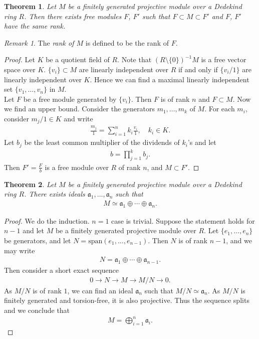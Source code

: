\documentclass[12pt]{article}
\theoremstyle{plain}
\newtheorem{theorem}{Theorem}[section]
\theoremstyle{remark}
\newtheorem*{remark}{Remark}
\theoremstyle{definition}
\begin{document}
\begin{theorem}
    Let $M$ be a finitely generated projective module over a Dedekind ring $R$. Then there exists free modules $F$, $F'$ such that $F\subset M\subset F'$ and $F$, $F'$ have the same rank.
\end{theorem}
\begin{remark}
    The \emph{rank of $M$} is defined to be the rank of $F$.
\end{remark}
\begin{proof}
    Let $K$ be a quotient field of $R$. Note that $(R\setminus\{0\})^{-1}M$ is a free vector space over $K$. $\{v_i\}\subset M$ are linearly independent over $R$ if and only if $\{v_i/1\}$ are linearly independent over $K$. Hence we can find a maximal linearly independent set $\{v_1,\dots,v_n\}$ in $M$. \\
    Let $F$ be a free module generated by $\{v_i\}$. Then $F$ is of rank $n$ and $F\subset M$. Now we find an upper bound. Consider the generators $m_1,\dots,m_k$ of $M$. For each $m_i$, consider $m_j/1\in K$ and write
    \begin{align*}
        \frac{m_j}{1} = \sum_{i=1}^n k_i\frac{v_i}{1},\quad k_i\in K. 
    \end{align*}
    Let $b_j$ be the least common multiplier of the dividends of $k_i$'s and let
    \begin{align*}
        b = \prod_{j=1}^k b_j.
    \end{align*}
    Then $F'=\frac{F}{b}$ is a free module over $R$ of rank $n$, and $M\subset F'$.
\end{proof}

\begin{theorem}
    Let $M$ be a finitely generated projective module over a Dedekind ring $R$. There exists ideals $\mathfrak{a}_1,\dots,\mathfrak{a}_n$ such that
    \begin{align*}
        M\simeq \mathfrak{a}_1\oplus \cdots\oplus \mathfrak{a}_n.
    \end{align*}
\end{theorem}
\begin{proof}
    We do the induction. $n=1$ case is trivial. Suppose the statement holds for $n-1$ and let $M$ be a finitely generated projective module over $R$. Let $\{e_1,\dots,e_n\}$ be generators, and let $N=\mathrm{span} (e_1,\dots,e_{n-1})$. Then $N$ is of rank $n-1$, and we may write
    \begin{align*}
        N=\mathfrak{a}_1 \oplus \cdots \oplus \mathfrak{a}_{n-1}.
    \end{align*}
    Then consider a short exact sequence
    \begin{align*}
        0 \to N \to M \to M/N \to 0.
    \end{align*}
    As $M/N$ is of rank $1$, we can find an ideal $\mathfrak{a}_n$ such that $M/N\simeq \mathfrak{a}_n$. As $M/N$ is finitely generated and torsion-free, it is also projective. Thus the sequence splits and we conclude that
    \begin{align*}
        M = \bigoplus_{i=1}^n \mathfrak{a}_i.
    \end{align*}
\end{proof}
\end{document}
